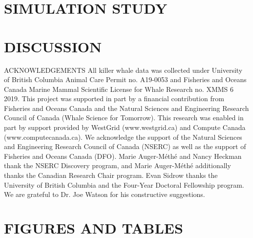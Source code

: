 \documentclass{TD-CJS}
\begin{document}
\section{SIMULATION STUDY}
\label{sec:sim_study}

%
\section{DISCUSSION}

%
\begin{ack}{ACKNOWLEDGEMENTS}
All killer whale data was collected under University of British Columbia Animal Care Permit no. A19-0053 and Fisheries and Oceans Canada Marine Mammal Scientific License for Whale Research no. XMMS 6 2019.
This project was supported in part by a financial contribution from Fisheries and Oceans Canada and the Natural Sciences and Engineering Research Council of Canada (Whale Science for Tomorrow).
This research was enabled in part by support provided by WestGrid (www.westgrid.ca) and Compute Canada (www.computecanada.ca).
We acknowledge the support of the Natural Sciences and Engineering Research Council of Canada (NSERC) as well as the support of Fisheries and Oceans Canada (DFO). 
Marie Auger-M\'eth\'e and Nancy Heckman thank the NSERC Discovery program, and Marie Auger-M\'eth\'e additionally thanks the Canadian Research Chair program.
Evan Sidrow thanks the University of British Columbia and the Four-Year Doctoral Fellowship program.
We are grateful to Dr. Joe Watson for his constructive suggestions.
\end{ack}
%
\newpage

%
\newpage
\begin{appendix}

\end{appendix}
%
\newpage
\section{FIGURES AND TABLES}

%
\end{document}

